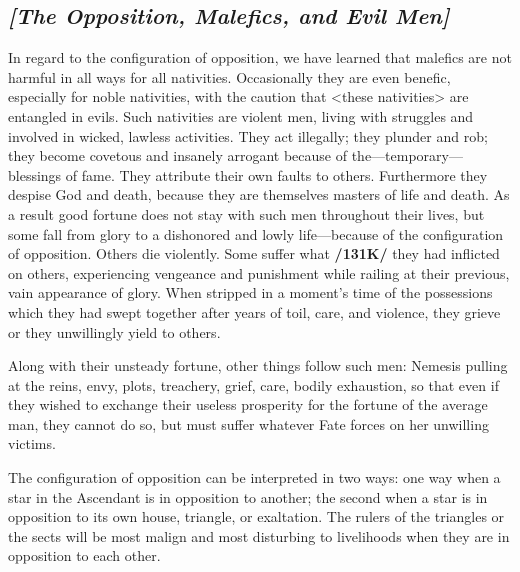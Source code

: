 \subsection{\textit{[The Opposition, Malefics, and Evil Men]}}
In  regard to the configuration of opposition, we have learned that malefics are not harmful in all ways for all nativities. Occasionally they are even benefic, especially for noble nativities, with the caution that <these nativities> are entangled in evils. Such nativities are violent men, living with struggles and involved in wicked, lawless activities. They act illegally; they plunder and rob; they become covetous and insanely arrogant because of the—temporary—blessings of fame. They attribute their own faults to others. Furthermore they despise God and death, because they are themselves masters of life and death. As a result good fortune does not stay with such men throughout their lives, but some fall from glory to a dishonored and lowly life—because of the configuration of opposition. Others die violently. Some suffer what \textbf{/131K/} they had inflicted on others, experiencing vengeance and punishment while railing at their previous, vain appearance of glory. When stripped in a moment’s time of the possessions which they had swept together
after years of toil, care, and violence, they grieve or they unwillingly yield to others. 

Along with their unsteady fortune, other things follow such men: Nemesis pulling at the reins, envy, plots, treachery, grief, care, bodily exhaustion, so that even if they wished to exchange their useless prosperity for the fortune of the average man, they cannot do so, but must suffer whatever Fate forces on her unwilling victims. 

The \mndl configuration of opposition can be interpreted in two ways: one way when a star in the Ascendant is in opposition to another; the second when a star is in opposition to its own house, triangle, or exaltation. The rulers of the triangles or the sects will be most malign and most disturbing to livelihoods when they are in opposition to each other.

\newpage